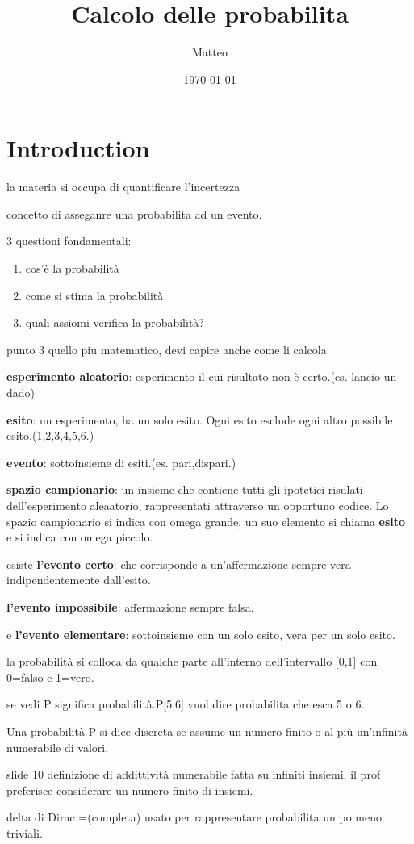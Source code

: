 \documentclass[12pt]{article}
\title{Calcolo delle probabilita }
\author{Matteo}
\date{\today}
\begin{document}
\maketitle

\section{Introduction}


la materia si occupa di quantificare l'incertezza

concetto di asseganre una probabilita ad un evento.

3 questioni fondamentali:
\begin{enumerate}
    \item cos'è la probabilità
    \item come si stima la probabilità
    \item quali assiomi verifica la probabilità?
\end{enumerate}

punto 3 quello piu matematico, devi capire anche come li calcola

\textbf{esperimento aleatorio}: esperimento il cui risultato non è certo.(es. lancio un dado)

\textbf{esito}: un esperimento, ha un solo esito. Ogni esito esclude ogni altro possibile esito.(1,2,3,4,5,6.)

\textbf{evento}: sottoinsieme di esiti.(es. pari,dispari.)

\textbf{spazio campionario}: un insieme che contiene tutti gli ipotetici risulati dell'esperimento aleaatorio, rappresentati attraverso un opportuno codice. Lo spazio campionario si indica con omega grande, un suo elemento si chiama \textbf{esito} e si indica con omega piccolo.

esiste \textbf{l'evento certo}: che corrisponde a un'affermazione sempre vera indipendentemente dall'esito.

\textbf{l'evento impossibile}: affermazione sempre falsa.

e \textbf{l'evento elementare}: sottoinsieme con un solo esito, vera per un solo esito.


la probabilità si colloca da qualche parte all'interno dell'intervallo [0,1] con 0=falso e 1=vero.

se vedi P significa probabilità.P[5,6] vuol dire probabilita che esca 5 o 6.

Una probabilità P si dice discreta se assume un numero finito o al più
un’infinità numerabile di valori.

slide 10 definizione di addittività numerabile fatta su infiniti insiemi, il prof preferisce considerare un numero finito di insiemi.

delta di Dirac =(completa) usato per rappresentare probabilita un po meno triviali.
\end{document}
